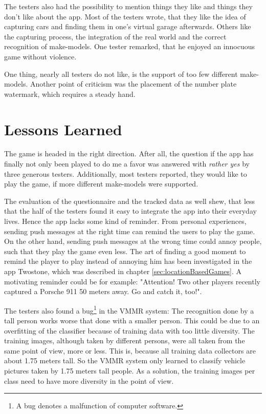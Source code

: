 The testers also had the possibility to mention things they like and things they don't like about the app. Most of the testers wrote, that they like the idea of capturing cars and finding them in one's virtual garage afterwards. Others like the capturing process, the integration of the real world and the correct recognition of make-models. One tester remarked, that he enjoyed an innocuous game without violence.

One thing, nearly all testers do not like, is the support of too few different make-models. Another point of criticism was the placement of the number plate watermark, which requires a steady hand.


\section{Lessons Learned}
The game is headed in the right direction. After all, the question if the app has finally not only been played to do me a favor was answered with \emph{rather yes} by three generous testers. Additionally, most testers reported, they would like to play the game, if more different make-models were supported.

The evaluation of the questionnaire and the tracked data as well shew, that less that the half of the testers found it easy to integrate the app into their everyday lives. Hence the app lacks some kind of reminder. From personal experiences, sending push messages at the right time can remind the users to play the game. On the other hand, sending push messages at the wrong time could annoy people, such that they play the game even less. The art of finding a good moment to remind the player to play instead of annoying him has been investigated in the app Twostone, which was described in chapter \ref{sec:locationBasedGames}. A motivating reminder could be for example: "Attention! Two other players recently captured a Porsche 911 50 meters away. Go and catch it, too!".

The testers also found a bug\footnote{A bug denotes a malfunction of computer software.} in the VMMR system: The recognition done by a tall person works worse that done with a smaller person. This could be due to an overfitting of the classifier because of training data with too little diversity. The training images, although taken by different persons, were all taken from the same point of view, more or less. This is, because all training data collectors are about 1.75 meters tall. So the VMMR system only learned to classify vehicle pictures taken by 1.75 meters tall people. As a solution, the training images per class need to have more diversity in the point of view.

